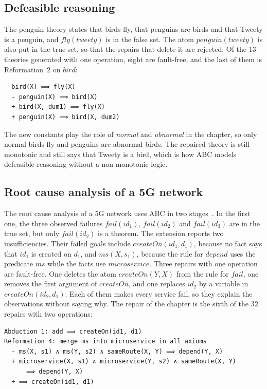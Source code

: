 \documentclass[preprint,12pt]{elsarticle}
\begin{document}
\subsection{Defeasible reasoning}

The penguin theory states that birds fly, that penguins are birds and that
Tweety is a penguin, and $\mathit{fly}(\mathit{tweety})$ is in the false
set. The atom $\mathit{penguin}(\mathit{tweety})$ is also put in the true
set, so that the repairs that delete it are rejected. Of the 13 theories
generated with one operation, eight are fault-free, and the last of them
is Reformation~2 on $\mathit{bird}$:
\begin{lstlisting}[language=Out]
  - bird(X) ⟹ fly(X)
  - penguin(X) ⟹ bird(X)
  + bird(X, dum1) ⟹ fly(X)
  + penguin(X) ⟹ bird(X, dum2)
\end{lstlisting}
The new constants play the role of \emph{normal} and \emph{abnormal} in
the chapter, so only normal birds fly and penguins are abnormal birds. The
repaired theory is still monotonic and still says that Tweety is a bird,
which is how ABC models defeasible reasoning without a non-monotonic logic.

\subsection{Root cause analysis of a 5G network}
\label{sec:5g}

The root cause analysis of a 5G network uses ABC in two
stages~\cite{LiEtAl22,Bundy26}. In the first one, the three observed
failures $\mathit{fail}(\mathit{id}_1)$, $\mathit{fail}(\mathit{id}_2)$ and
$\mathit{fail}(\mathit{id}_3)$ are in the true set, but only
$\mathit{fail}(\mathit{id}_2)$ is a theorem. The extension reports two
insufficiencies. Their failed goals include
$\mathit{createOn}(\mathit{id}_1, d_1)$, because no fact says that
$\mathit{id}_1$ is created on $d_1$, and $\mathit{ms}(X, s_1)$, because the
rule for $\mathit{depend}$ uses the predicate $\mathit{ms}$ while the facts
use $\mathit{microservice}$. Three repairs with one operation are
fault-free. One deletes the atom $\mathit{createOn}(Y, X)$ from the rule for
$\mathit{fail}$, one removes the first argument of $\mathit{createOn}$, and
one replaces $\mathit{id}_2$ by a variable in
$\mathit{createOn}(\mathit{id}_2, d_1)$. Each of them makes every service
fail, so they explain the observations without saying why. The repair of
the chapter is the sixth of the 32 repairs with two operations:
\begin{lstlisting}[language=Out]
Abduction 1: add ⟹ createOn(id1, d1)
Reformation 4: merge ms into microservice in all axioms
  - ms(X, s1) ∧ ms(Y, s2) ∧ sameRoute(X, Y) ⟹ depend(Y, X)
  + microservice(X, s1) ∧ microservice(Y, s2) ∧ sameRoute(X, Y)
      ⟹ depend(Y, X)
  + ⟹ createOn(id1, d1)
\end{lstlisting}
\end{document}
